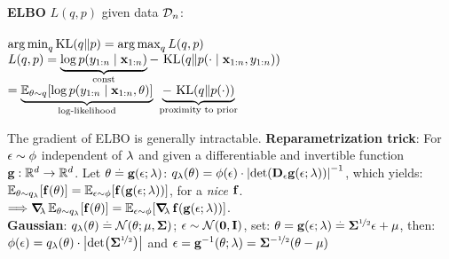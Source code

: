 \vspace{1mm}
\begin{framed}
    \textbf{ELBO} $L(q,p)$ given data $\mathcal{D}_n$:\\ \\
        $\argmin_q \KL{q}{p}=\argmax_q L(q,p)$ \\
        $L(q, p) = \underbrace{\log p(y_{1:n} \mid \vx_{1:n})}_{\const} -\ \KL{q}{p(\cdot \mid \vx_{1:n}, y_{1:n})}$ \\
        $= \underbrace{\E[\vtheta \sim q]{\log p(y_{1:n} \mid \vx_{1:n}, \vtheta)}}_{\text{log-likelihood}}\ \underbrace{-\ \KL{q}{p(\cdot)}}_{\text{proximity to prior}}$
\end{framed}
The gradient of ELBO is generally intractable. \textbf{Reparametrization trick}: For $\mathbf{\epsilon} \sim \phi$ independent of $\mathbf{\lambda}$ and given a differentiable and invertible function $\mathbf{g} : \mathbb{R}^d \to \mathbb{R}^d$. Let $\mathbf{\theta} \overset{.}{=} \mathbf{g}(\mathbf{\epsilon}; \mathbf{\lambda})$: $q_\vlambda(\vtheta) = \phi(\vepsilon) \cdot \inv{\abs{\det{\jac_\vepsilon \vg(\vepsilon; \vlambda)}}}$, which yields: $\E[\vtheta \sim q_\vlambda]{\vf(\vtheta)} = \E[\vepsilon \sim \phi]{\vf(\vg(\vepsilon; \vlambda))}$, for a \textit{nice} $\mathbf{f}$. \\
$\Longrightarrow\grad_\vlambda \E[\vtheta \sim q_\vlambda]{\vf(\vtheta)} = \E[\vepsilon \sim \phi]{\grad_\vlambda \vf(\vg(\vepsilon; \vlambda))}$. \\
\textbf{Gaussian}: $q_\vlambda(\vtheta) \defeq \N[\vtheta]{\vmu}{\mSigma}$; ${\vepsilon \sim \SN}$, set: $\mathbf{\theta} = \mathbf{g}(\mathbf{\epsilon}; \mathbf{\lambda}) \overset{.}{=} \mathbf{\Sigma}^{\nicefrac{1}{2}} \mathbf{\epsilon} + \mathbf{\mu}$, then: $\phi(\vepsilon) = q_\vlambda(\vtheta) \cdot \abs{\det{\msqrt{\mSigma}}}$ and $\mathbf{\epsilon} = \mathbf{g}^{-1}(\mathbf{\theta}; \mathbf{\lambda}) = \mathbf{\Sigma}^{-\nicefrac{1}{2}}(\mathbf{\theta} - \mathbf{\mu})$
